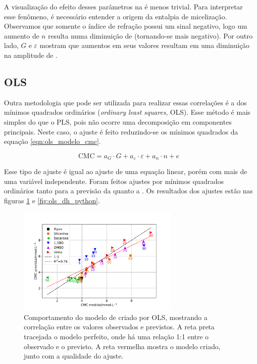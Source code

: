 		A visualização do efeito desses parâmetros na \DHmic é menos trivial. Para interpretar esse fenômeno, é necessário entender a origem da entalpia de micelização. %
		Observamos que somente o índice de refração possui um sinal negativo, logo um aumento de \(n\) resulta numa diminuição de \DHmic{} (tornando-se mais negativo). Por outro lado, \(G\) e \(\varepsilon\) mostram que aumentos em seus valores resultam em uma diminuição na amplitude de \DHmic. 
		
		\FloatBarrier
		\subsection{OLS}
		
		Outra metodologia que pode ser utilizada para realizar essas correlações é a dos mínimos quadrados ordinários (\emph{ordinary least squares}, OLS). Esse método é mais simples do que o PLS, pois não ocorre uma decomposição em componentes principais. Neste caso, o ajuste é feito reduzindo-se os mínimos quadrados da equação \ref{eqn:ols_modelo_cmc}.
		
		\begin{equation}
			\textrm{CMC} = a_G \cdot G + a_\varepsilon \cdot \varepsilon + a_n \cdot n + e
			\label{eqn:ols_modelo_cmc}
		\end{equation}
		
		Esse tipo de ajuste é igual ao ajuste de uma equação linear, porém com mais de uma variável independente. Foram feitos ajustes por mínimos quadrados ordinários tanto para a previsão da \cmc{} quanto a \DHmic. Os resultados dos ajustes estão nas figuras \ref{fig:ols_cmc_python} e \ref{fig:ols_dh_python}.
		
		\begin{figure}[h]
			\centering
			\includegraphics[width=0.7\textwidth]{imagens/itc/ols_cmc_python}
			\caption{Comportamento do modelo de \cmc{} criado por OLS, mostrando a correlação entre os valores observados e previstos. A reta preta tracejada o modelo perfeito, onde há uma relação 1:1 entre o observado e o previsto. A reta vermelha mostra o modelo criado, junto com a qualidade do ajuste.}
			\label{fig:ols_cmc_python}
		\end{figure}
		
